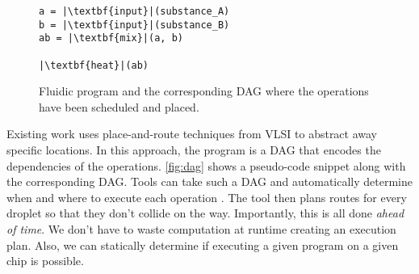 \documentclass[
  10pt,
  a4paper,
  twocolumn,
]{article}
\begin{document}
\begin{figure}
  \hfill
  \begin{minipage}{0.5\linewidth}
    \begin{verbatim}
a = |\textbf{input}|(substance_A)
b = |\textbf{input}|(substance_B)
ab = |\textbf{mix}|(a, b)

|\textbf{heat}|(ab)
    \end{verbatim}
  \end{minipage}
  \hfill
  \begin{minipage}{0.35\linewidth}
  \end{minipage}
  \hfill

  \caption{
    Fluidic program and the corresponding DAG where the operations have been
    scheduled and placed.
  }
\label{fig:dag}
\end{figure}

Existing work uses place-and-route techniques from VLSI to abstract away specific locations.
In this approach, the program is a DAG that encodes the dependencies of the operations.
\autoref{fig:dag} shows a pseudo-code snippet along with the corresponding DAG.
Tools can take such a DAG and automatically determine when and where to execute each operation \cite{grissom2015open}.
The tool then plans routes for every droplet so that they don't collide on the way.
Importantly, this is all done \emph{ahead of time}.
We don't have to waste computation at runtime creating an execution plan.
Also, we can statically determine if executing a given program on a given chip is possible.
\end{document}
